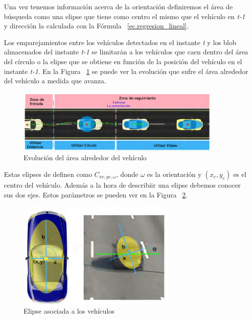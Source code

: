Una vez tenemos información acerca de la orientación definiremos el área de búsqueda como una elipse que tiene como centro el mismo que el vehículo en \textit{t-1} y dirección la calculada con la Fórmula ~\ref{ec.regresion_lineal}.

Los emparejamientos entre los vehículos detectados en el instante \textit{t} y los blob almacenados del instante \textit{t-1} se limitarán a los vehículos que caen dentro del área del círculo o la elipse que se obtiene en función de la posición del vehículo en el instante \textit{t-1}. En la Figura ~\ref{fig.area_vehiculo} se puede ver la evolución que sufre el área alrededor del vehículo a medida que avanza.

 \begin{figure}
\begin{center}
	\includegraphics[width=0.9\textwidth]{figures/Diseno_global/areas_vehiculo.png}
   \caption{Evolución del área alrededor del vehículo}
	\label{fig.area_vehiculo}
\end{center}
\end{figure}


Estas elipses de definen como $C_{xc,yc,\omega}$, donde $\omega$ es la orientación y $(x_c, y_c)$ es el centro del vehículo. Además a la hora de describiir una elipse debemos conocer sus dos ejes. Estos parámetros se pueden ver en la Figura ~\ref{fig.elipse}.

 \begin{figure}
\begin{center}
    \includegraphics[width=0.7\textwidth]{figures/Diseno_global/elipse.png}
   \caption{Elipse asociada a los vehículos}
	\label{fig.elipse}
\end{center}
\end{figure}

